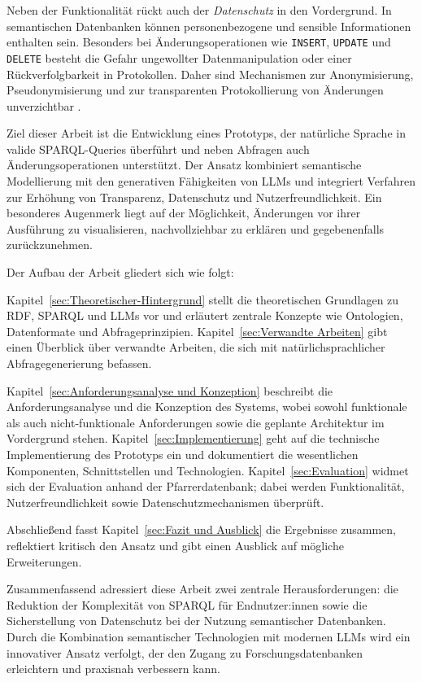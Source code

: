 Neben der Funktionalität rückt auch der \emph{Datenschutz} in den Vordergrund. In semantischen Datenbanken können personenbezogene und sensible Informationen enthalten sein. Besonders bei Änderungsoperationen wie \texttt{INSERT}, \texttt{UPDATE} und \texttt{DELETE} besteht die Gefahr ungewollter Datenmanipulation oder einer Rückverfolgbarkeit in Protokollen. Daher sind Mechanismen zur Anonymisierung, Pseudonymisierung und zur transparenten Protokollierung von Änderungen unverzichtbar \cite{eu2016gdpr}.

Ziel dieser Arbeit ist die Entwicklung eines Prototyps, der natürliche Sprache in valide SPARQL-Queries überführt und neben Abfragen auch Änderungsoperationen unterstützt. Der Ansatz kombiniert semantische Modellierung mit den generativen Fähigkeiten von LLMs und integriert Verfahren zur Erhöhung von Transparenz, Datenschutz und Nutzerfreundlichkeit. Ein besonderes Augenmerk liegt auf der Möglichkeit, Änderungen vor ihrer Ausführung zu visualisieren, nachvollziehbar zu erklären und gegebenenfalls zurückzunehmen.

Der Aufbau der Arbeit gliedert sich wie folgt:

Kapitel~\ref{sec:Theoretischer-Hintergrund} stellt die theoretischen Grundlagen zu RDF, SPARQL und LLMs vor und erläutert zentrale Konzepte wie Ontologien, Datenformate und Abfrageprinzipien. Kapitel~\ref{sec:Verwandte Arbeiten} gibt einen Überblick über verwandte Arbeiten, die sich mit natürlichsprachlicher Abfragegenerierung befassen.

Kapitel~\ref{sec:Anforderungsanalyse und Konzeption} beschreibt die Anforderungsanalyse und die Konzeption des Systems, wobei sowohl funktionale als auch nicht-funktionale Anforderungen sowie die geplante Architektur im Vordergrund stehen. Kapitel~\ref{sec:Implementierung} geht auf die technische Implementierung des Prototyps ein und dokumentiert die wesentlichen Komponenten, Schnittstellen und Technologien. Kapitel~\ref{sec:Evaluation} widmet sich der Evaluation anhand der Pfarrerdatenbank; dabei werden Funktionalität, Nutzerfreundlichkeit sowie Datenschutzmechanismen überprüft.

Abschließend fasst Kapitel~\ref{sec:Fazit und Ausblick} die Ergebnisse zusammen, reflektiert kritisch den Ansatz und gibt einen Ausblick auf mögliche Erweiterungen.

Zusammenfassend adressiert diese Arbeit zwei zentrale Herausforderungen: die Reduktion der Komplexität von SPARQL für Endnutzer:innen sowie die Sicherstellung von Datenschutz bei der Nutzung semantischer Datenbanken. Durch die Kombination semantischer Technologien mit modernen LLMs wird ein innovativer Ansatz verfolgt, der den Zugang zu Forschungsdatenbanken erleichtern und praxisnah verbessern kann.










